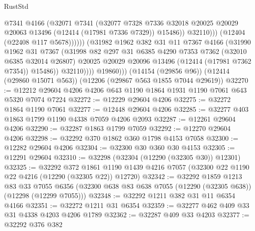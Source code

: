 \begin{lexlean}{RustStd}
\begin{coremodule}
{\begin{coremodule}
{{{{{{{{{{{{{{{{{{{{{{{{{{{{{{{{{{{{{{{{{{{{{{{{{{                              @7341
                              @4166
                              (@32071
                                @7341
                                (@32077
                                  @7328
                                  @7336
                                  @32018
                                  @20025
                                  @20029
                                  @20063
                                  @13496
                                  (@12414 (@17981 @7336 @7329))
                                  @15486))
                              @32110)))
                        (@12404 (@22408 @117 @5678))))))
                (@31982
                  @1962
                  @382
                  @31
                  @11
                  @7367
                  @4166
                  (@31990
                    @1962
                    @31
                    @7367
                    (@31998
                      @82
                      @297
                      @31
                      @6385
                      @4290
                      @7353
                      @7362
                      (@32010 @6385 @32014 @26807)
                      @20025
                      @20029
                      @20096
                      @13496
                      (@12414 (@17981 @7362 @7354))
                      @15486))
                  @32110))))
          @19860)))
    (@14154 (@29856 @96))
    (@12414 (@29860 @15071 @563))
    (@12206 (@29867 @563 @1855 @7044 @29619))
@32270 := @12212 @29604 @4206 @4206 @643 @1190 @1864 @1931 @1190 @7061 @643 @5320 @7074 @7224
@32272 := @12229 @29604 @4206
@32275 := @32272 @1864 @1190 @7061
@32277 := @12448 @29604 @4206
@32285 := @32277 @403 @1863 @1799 @1190 @4338 @7059 @4206 @2093
@32287 := @12261 @29604 @4206
@32290 := @32287 @1863 @1799 @7059
@32292 := @12270 @29604 @4206
@32298 := @32292 @370 @1862 @360 @1798 @4153 @7058
@32300 := @12282 @29604 @4206
@32304 := @32300 @30 @360 @30 @4153
@32305 := @12291 @29604
@32310 := @32298 (@32304 (@12290 (@32305 @30)) @12301)
@32325 := @32292
    @372
    @1861
    @1190
    @1439
    @4216
    @7057
    (@32300 @22 @1190 @22 @4216 (@12290 (@32305 @22)) @12720)
@32342 := @32292
    @1859
    @1213
    @83
    @33
    @7055
    @6356
    (@32300 @638 @83 @638 @7055 (@12290 (@32305 @638)) (@12298 (@12299 @7055)))
@32348 := @32292 @1211 @382 @31 @11 @6354 @4166
@32351 := @32272 @1211 @31 @6354
@32359 := @32277 @462 @409 @33 @31 @4338 @4203 @4206 @1789
@32362 := @32287 @409 @33 @4203
@32377 := @32292
    @376
    @382
}}}}}}}}}}}}}}}}}}}}}}}}}}}}}}}}}}}}}}}}}}}}}}}}}}
\end{coremodule}}
\end{coremodule}
\end{lexlean}
